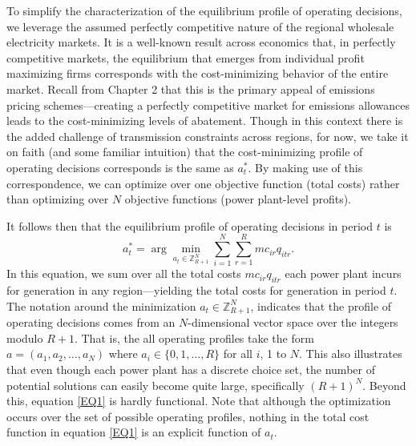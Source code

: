 To simplify the characterization of the equilibrium profile of operating decisions, we leverage the assumed perfectly competitive nature of the regional wholesale electricity markets. It is a well-known result across economics that, in perfectly competitive markets, the equilibrium that emerges from individual  profit maximizing firms corresponds with the cost-minimizing behavior of the entire market. Recall from Chapter 2 that this is the primary appeal of emissions pricing schemes---creating a perfectly competitive market for emissions allowances leads to the cost-minimizing levels of abatement. Though in this context there is the added challenge of transmission constraints across regions, for now, we take it on faith (and some familiar intuition) that the cost-minimizing profile of operating decisions corresponds is the same as $a_t^*$. By making use of this correspondence, we can optimize over one objective function (total costs) rather than optimizing over $N$ objective functions (power plant-level profits). 

It follows then that the equilibrium profile of operating decisions in period $t$ is
\begin{equation}\label{EQ1}
    a_t^* = \arg\min_{a_t \in \mathbb{Z}_{R + 1}^N} \sum_{i = 1}^N \sum_{r = 1}^R mc_{ir} q_{itr}.
\end{equation}
In this equation, we sum over all the total costs $mc_{ir} q_{itr}$ each power plant incurs for generation in any region---yielding the total costs for generation in period $t$. The notation around the minimization $a_t \in \mathbb{Z}_{R + 1}^N$, indicates that the profile of operating decisions comes from an $N$-dimensional vector space over the integers modulo $R +1$. That is, the all operating profiles take the form $a = (a_{1}, a_2, \ldots, a_N)$ where $a_i \in \{0, 1, \ldots, R\}$ for all $i$, 1 to $N$. This also illustrates that even though each power plant has a discrete choice set, the number of potential solutions can easily become quite large, specifically $(R + 1)^N$. Beyond this, equation \eqref{EQ1} is hardly functional. Note that although the optimization occurs over the set of possible operating profiles, nothing in the total cost function in equation \eqref{EQ1} is an explicit function of $a_{t}$. 

